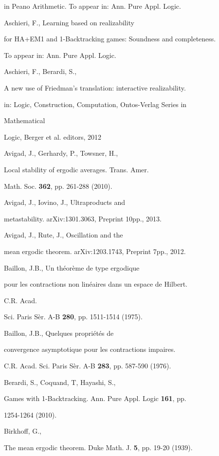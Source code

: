 \documentclass[1p]{elsarticle}
\theoremstyle{plain}
\theoremstyle{definition}
\theoremstyle{remark}
\theoremstyle{definition}
\begin{document}
{\begin{thebibliography}{00}
in Peano Arithmetic. To appear in: Ann. Pure Appl. Logic.

 Aschieri, F., Learning based on realizability 

for HA+EM1 and 1-Backtracking games: Soundness and completeness. 

To appear in: Ann. Pure Appl. Logic.

 Aschieri, F., Berardi, S., 

A new use of Friedman's translation: interactive realizability.  

in: Logic, Construction, Computation, Ontos-Verlag Series in 

Mathematical 

Logic, Berger et al. editors, 2012

 Avigad, J., Gerhardy, P., Towsner, H., 

Local stability of ergodic averages. Trans. Amer. 

Math. Soc. {\bf 362}, pp. 261-288 (2010). 

 Avigad, J., Iovino, J., Ultraproducts and 

metastability. arXiv:1301.3063, Preprint 10pp., 2013.

 Avigad, J., Rute, J., Oscillation and the 

mean ergodic theorem. arXiv:1203.1743, Preprint 7pp., 2012.

 Baillon, J.B., Un th\'eor\`eme de type ergodique 

pour les contractions non lin\'eaires dans un espace de Hilbert. 

C.R. Acad. 

Sci. Paris S\`er. A-B {\bf 280}, pp. 1511-1514 (1975).

 Baillon, J.B., Quelques propri\'et\'es de 

convergence asymptotique pour les contractions impaires. 

C.R. Acad. Sci. Paris S\`er. A-B {\bf 283}, pp. 587-590 (1976). 

 Berardi, S., Coquand, T, Hayashi, S., 

Games with 1-Backtracking. Ann. Pure Appl. Logic {\bf 161}, pp. 

1254-1264 (2010).

 Birkhoff, G., 

The mean ergodic theorem. Duke Math. J. {\bf 5}, pp. 19-20 (1939). 


\end{thebibliography}}
\end{document}
